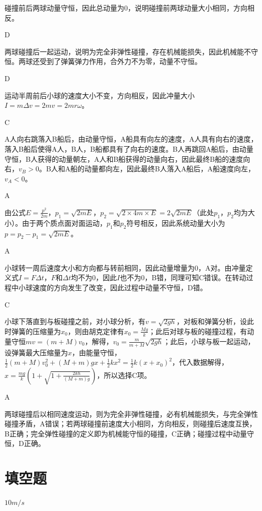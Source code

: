 \documentclass[b5paper,opensource,sourcefont,parskip]{qyxf-book}
\begin{document}
碰撞前后两球动量守恒，因此总动量为0，说明碰撞前两球动量大小相同，方向相反。

D

两球碰撞后一起运动，说明为完全非弹性碰撞，存在机械能损失，因此机械能不守恒。两球还受到了弹簧弹力作用，合外力不为零，动量不守恒。

D

运动半周前后小球的速度大小不变，方向相反，因此冲量大小\(I=m\Delta v=2mv=2mr \omega\)。

C

A人向右跳落入B船后，由动量守恒，A船具有向左的速度，A人具有向右的速度，落入B船后使得A人，B人，B船都具有了向右的速度。B人再跳回A船后，由动量守恒，B人获得的动量朝左，A人和B船获得的动量向右，因此最终B船的速度向右，\(v_B>0\)。B人和A船的动量都向左，因此最终B人落入A船后，A船速度向左，\(v_A<0\)。
			
A

由公式\(E=\frac{p^2}{2m}\)，\(p_1=\sqrt{2mE}\)，\(p_2=\sqrt{2\times 4m\times E}=2\sqrt{2mE}\)（此处\(p_1\)，\(p_2\)均为大小）。由于两个质点面对面运动，\(p_1\)和\(p_2\)符号相反，因此系统动量大小为\(p=p_2-p_1=\sqrt{2mE}\)。
			
A

小球转一周后速度大小和方向都与转前相同，因此动量增量为0，A对。由冲量定义式\(I=F\Delta t\)，\(F\)和\(\Delta t\)均不为0，因此\(I\)也不为0，B错，同理可知C错误。在转动过程中小球速度的方向发生了改变，因此过程中动量不守恒，D错。
			
C
			
小球下落直到与板碰撞之前，对小球分析，有\(v=\sqrt{2gh}\)，对板和弹簧分析，设此时弹簧的压缩量为\(x_0\)，则由胡克定律有\(x_0=\frac{Mg}{k}\)；此后对球与板的碰撞过程，有动量守恒\(mv=(m+M)v_0\)，解得，\(v_0=\frac{m}{m+M}\sqrt{2gh}\)；此后，小球与板一起运动，设弹簧最大压缩量为\(x\)，由能量守恒，\(\frac{1}{2}(m+M)v_0^2+(M+m)gx+\frac{1}{2}kx^2=\frac{1}{2}k(x+x_0)^2\)，代入数据解得，\(x=\frac{mg}{k}(1+\sqrt{1+\frac{2kh}{(M+m)g}})\)，所以选择C项。
			
A
			
两球碰撞后以相同速度运动，则为完全非弹性碰撞，必有机械能损失，与完全弹性碰撞矛盾，A错误；若两球碰撞前速度大小相同，方向相反，则碰撞后速度互换，B正确；完全弹性碰撞的定义即为机械能守恒的碰撞，C正确；碰撞过程中动量守恒，D正确。

\section{填空题}
$10m/s$
\end{document}
